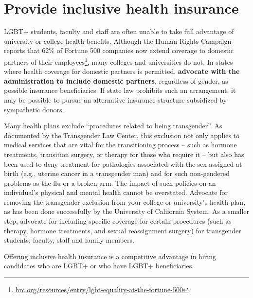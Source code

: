 \section {Provide inclusive health insurance}
\label{health-insurance}
LGBT+ students, faculty and staff are often unable to take full advantage of university or college health benefits.  Although the Human Rights Campaign reports that 62\% of Fortune 500 companies now extend coverage to domestic partners of their employees\footnote{\href{http://www.hrc.org/resources/entry/lgbt-equality-at-the-fortune-500}{hrc.org/resources/entry/lgbt-equality-at-the-fortune-500}}, many colleges and universities do not.  In states where health coverage for domestic partners is permitted, \textbf{advocate with the administration to include domestic partners}, regardless of gender, as possible insurance beneficiaries. If state law prohibits such an arrangement, it may be possible to pursue an alternative insurance structure subsidized by sympathetic donors. 

Many health plans exclude ``procedures related to being transgender''. As documented by the Transgender Law Center, this exclusion not only applies to medical services that are vital for the transitioning process -- such as hormone treatments, transition surgery, or therapy for those who require it -- but also has been used to deny treatment for pathologies associated with the sex assigned at birth (e.g., uterine cancer in a transgender man) and for such non-gendered problems as the flu or a broken arm. The impact of such policies on an individual's physical and mental health cannot be overstated. Advocate for removing the transgender exclusion from your college or university's health plan, as has been done successfully by the University of California System.  As a smaller step, advocate for including specific coverage for certain procedures (such as therapy, hormone treatments, and sexual reassignment surgery) for transgender students, faculty, staff and family members.

Offering inclusive health insurance is a competitive advantage in hiring candidates who are LGBT+ or who have LGBT+ beneficiaries.



